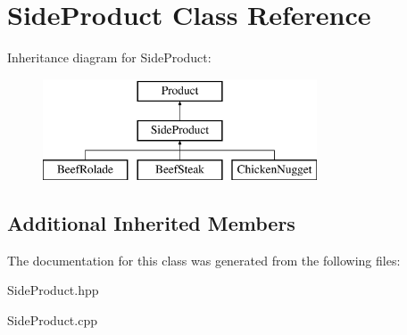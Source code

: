 \hypertarget{class_side_product}{}\section{Side\+Product Class Reference}
\label{class_side_product}
Inheritance diagram for Side\+Product\+:\begin{figure}[H]
\begin{center}
\leavevmode
\includegraphics[height=3.000000cm]{class_side_product}
\end{center}
\end{figure}
\subsection*{Additional Inherited Members}


The documentation for this class was generated from the following files\+:\begin{DoxyCompactItemize}
\item 
Side\+Product.\+hpp\item 
Side\+Product.\+cpp\end{DoxyCompactItemize}
